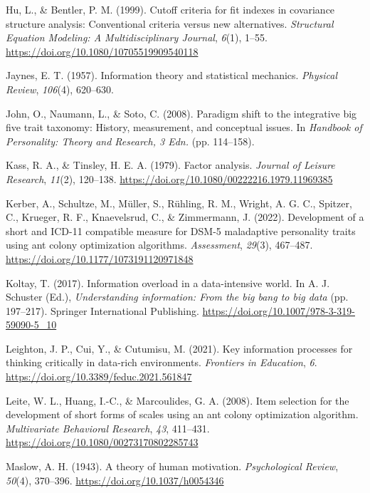\documentclass[
  12pt,
  a4paper,
  twoside]{article}
\newlength{\cslhangindent}
\newenvironment{CSLReferences}[2] %
 {\begin{list}{}{%
  \setlength{\itemindent}{0pt}
  \setlength{\leftmargin}{0pt}
  \setlength{\parsep}{0pt}
  \ifodd #1
   \setlength{\leftmargin}{\cslhangindent}
   \setlength{\itemindent}{-1\cslhangindent}
  \fi
  \setlength{\itemsep}{#2\baselineskip}}}
 {\end{list}}
\begin{document}
\begin{CSLReferences}{1}{0}
Hu, L., \& Bentler, P. M. (1999). Cutoff criteria for fit indexes in covariance structure analysis: Conventional criteria versus new alternatives. \emph{Structural Equation Modeling: A Multidisciplinary Journal}, \emph{6}(1), 1--55. \url{https://doi.org/10.1080/10705519909540118}

Jaynes, E. T. (1957). Information theory and statistical mechanics. \emph{Physical Review}, \emph{106}(4), 620--630.

John, O., Naumann, L., \& Soto, C. (2008). Paradigm shift to the integrative big five trait taxonomy: History, measurement, and conceptual issues. In \emph{Handbook of Personality: Theory and Research, 3 Edn.} (pp. 114--158).

Kass, R. A., \& Tinsley, H. E. A. (1979). Factor analysis. \emph{Journal of Leisure Research}, \emph{11}(2), 120--138. \url{https://doi.org/10.1080/00222216.1979.11969385}

Kerber, A., Schultze, M., Müller, S., Rühling, R. M., Wright, A. G. C., Spitzer, C., Krueger, R. F., Knaevelsrud, C., \& Zimmermann, J. (2022). Development of a short and ICD-11 compatible measure for DSM-5 maladaptive personality traits using ant colony optimization algorithms. \emph{Assessment}, \emph{29}(3), 467--487. \url{https://doi.org/10.1177/1073191120971848}

Koltay, T. (2017). Information overload in a data-intensive world. In A. J. Schuster (Ed.), \emph{Understanding information: From the big bang to big data} (pp. 197--217). Springer International Publishing. \url{https://doi.org/10.1007/978-3-319-59090-5_10}

Leighton, J. P., Cui, Y., \& Cutumisu, M. (2021). Key information processes for thinking critically in data-rich environments. \emph{Frontiers in Education}, \emph{6}. \url{https://doi.org/10.3389/feduc.2021.561847}

Leite, W. L., Huang, I.-C., \& Marcoulides, G. A. (2008). Item selection for the development of short forms of scales using an ant colony optimization algorithm. \emph{Multivariate Behavioral Research}, \emph{43}, 411--431. \url{https://doi.org/10.1080/00273170802285743}

Maslow, A. H. (1943). A theory of human motivation. \emph{Psychological Review}, \emph{50}(4), 370--396. \url{https://doi.org/10.1037/h0054346}


\end{CSLReferences}
\end{document}
